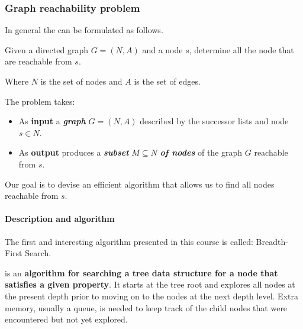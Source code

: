 \newpage

\subsubsection{Graph reachability problem}

In general the  can be formulated as follows.

\begin{definitionbox}
    Given a directed graph $G = \left(N,A\right)$ and a node $s$, determine all the node that are reachable from $s$.
\end{definitionbox}

\noindent
Where $N$ is the set of nodes and $A$ is the set of edges.

\highspace
The problem takes:
\begin{itemize}
    \item As \textbf{input} a \emph{\textbf{graph}} $G = \left(N,A\right)$ described by the successor lists and node $s \in N$.
    
    \item As \textbf{output} produces a \emph{\textbf{subset}} $M \subseteq N$ \emph{\textbf{of nodes}} of the graph $G$ reachable from $s$.
\end{itemize}
Our goal is to devise an efficient algorithm that allows us to find all nodes reachable from $s$.

\longline

\paragraph{Description and algorithm}

The first and interesting algorithm presented in this course is called: Breadth-First Search.

\begin{definitionbox}
     is an \textbf{algorithm for searching a tree data structure for a node that satisfies a given property}. It starts at the tree root and explores all nodes at the present depth prior to moving on to the nodes at the next depth level. Extra memory, usually a queue, is needed to keep track of the child nodes that were encountered but not yet explored.
\end{definitionbox}

